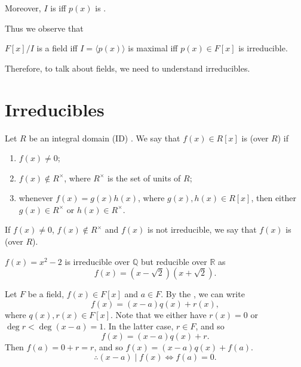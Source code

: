 \documentclass[notoc,notitlepage,nobib]{tufte-book}
\begin{document}
Moreover, $I$ is  iff $p(x)$ is .

Thus we observe that
\begin{center}
  $F[x]/I$ is a field iff $I = \langle p(x) \rangle$ is maximal iff $p(x) \in F[x]$ is irreducible.
\end{center}

Therefore, to talk about fields, we need to understand irreducibles.


\section{Irreducibles}%
\label{sec:irreducibles}

\begin{defn}[Irreducible]\label{defn:irreducible}
  Let $R$ be an integral domain (ID) . We say that $f(x) \in R[x]$ is 
  (over $R$) if
  \begin{enumerate}
    \item $f(x) \neq 0$;
    \item $f(x) \notin R^\times$, where $R^\times$ is the set of units of $R$;
    \item whenever $f(x) = g(x) h(x)$, where $g(x), h(x) \in R[x]$, then either 
      $g(x) \in R^\times$ or $h(x) \in R^\times$.
  \end{enumerate}
  If $f(x) \neq 0$, $f(x) \notin R^\times$ and $f(x)$ is not irreducible, we say that
  $f(x)$ is  (over $R$).
\end{defn}

\begin{eg}
  $f(x) = x^2 - 2$ is irreducible over $\mathbb{Q}$ but reducible over $\mathbb{R}$ as
  \begin{equation*}
    f(x) = \left(x - \sqrt{2}\right)\left(x + \sqrt{2}\right).
  \end{equation*}
\end{eg}

Let $F$ be a field, $f(x) \in F[x]$ and $a \in F$. By the ,
we can write
\begin{equation*}
  f(x) = (x - a) q(x) + r(x),
\end{equation*}
where $q(x), r(x) \in F[x]$. Note that we either have $r(x) = 0$ or 
$\deg r < \deg (x - a) = 1$. In the latter case, $r \in F$, and so
\begin{equation*}
  f(x) = (x - a) q(x) + r.
\end{equation*}
Then $f(a) = 0 + r = r$, and so $f(x) = (x - a) q(x) + f(a)$.
\begin{equation*}
  \therefore (x - a) \mid f(x) \iff f(a) = 0.
\end{equation*}
\end{document}
